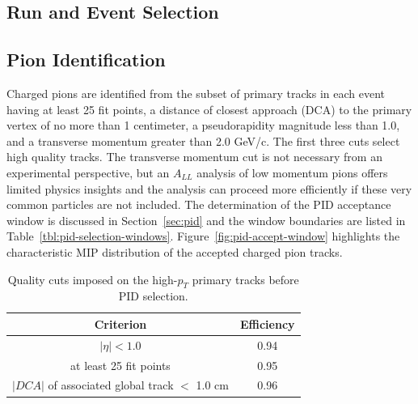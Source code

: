 
\subsection{Run and Event Selection}





\subsection{Pion Identification}

Charged pions are identified from the subset of primary tracks in each event
having at least 25 fit points, a distance of closest approach (DCA) to the
primary vertex of no more than 1 centimeter, a pseudorapidity magnitude less
than 1.0, and a transverse momentum greater than 2.0 GeV/c. The first three cuts
select high quality tracks. The transverse momentum cut is not necessary from an
experimental perspective, but an \(A_{LL}\) analysis of low momentum pions
offers limited physics insights and the analysis can proceed more efficiently if
these very common particles are not included. The determination of the PID
acceptance window is discussed in Section~\ref{sec:pid} and the window
boundaries are listed in Table~\ref{tbl:pid-selection-windows}.
Figure~\ref{fig:pid-accept-window} highlights the characteristic MIP
distribution of the accepted charged pion tracks.


\begin{table}
  \centering
  \begin{tabular}{|c|c|}
    \hline
    Criterion & Efficiency \\
    \hline
    $|\eta| < 1.0$ & 0.94 \\
    at least 25 fit points & 0.95 \\
    $|DCA|$ of associated global track $<$ 1.0 cm & 0.96 \\
    \hline
  \end{tabular}
  \caption{Quality cuts imposed on the high-$p_T$ primary tracks before PID selection.}
\end{table}

